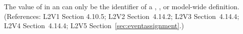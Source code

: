 The value of  in an \EventAssignment can only be the
identifier of a \Compartment, \Species, or model-wide \Parameter
definition.  (References: L2V1 Section 4.10.5; L2V2 Section~4.14.2;
L2V3 Section~4.14.4; L2V4 Section~4.14.4; L2V5 Section~\ref{sec:eventassignment}.)
